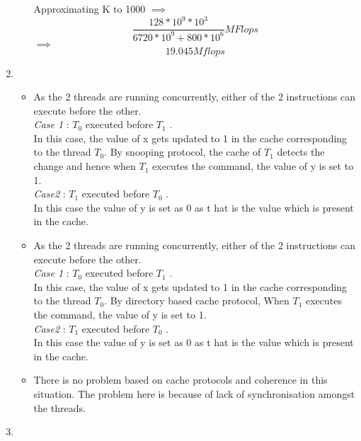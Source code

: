 \documentclass[11pt]{article}
\begin{document}
\begin{enumerate}
\begin{itemize}
\[				\]
				Approximating K to 1000 $\implies$
				\[
						\frac{128*10^9*10^3}{6720*10^9 + 800*10^6} MFlops
				\]
				$\implies$  \[
					19.045 Mflops
				\]
\end{itemize}
\item %
	\begin{itemize}
			\item As the 2 threads are running concurrently, either of the 2 instructions can execute before the other.\\
			\textit{Case 1} : $T_0$ executed before $T_1$ . \\
				In this case, the value of x gets updated to 1 in the cache corresponding to the thread $T_0$. By snooping protocol, the cache of $T_1$ detects the change and hence when $T_1$ executes the command, the value of y is set to 1.\\
			\textit{Case2} : $T_1$ executed before $T_0$ . \\
				In this case the value of y is set as 0 as t  hat is the value which is present in the cache.
			\item As the 2 threads are running concurrently, either of the 2 instructions can execute before the other.\\
			\textit{Case 1} : $T_0$ executed before $T_1$ . \\
				In this case, the value of x gets updated to 1 in the cache corresponding to the thread $T_0$. By directory based cache protocol, When $T_1$ executes the command, the value of y is set to 1.\\
			\textit{Case2} : $T_1$ executed before $T_0$ . \\
				In this case the value of y is set as 0 as t  hat is the value which is present in the cache.
			\item There is no problem based on cache protocols and coherence in this situation. The problem here is because of lack of synchronisation amongst the threads.
	\end{itemize}
\item %

\end{enumerate}
\end{document}
